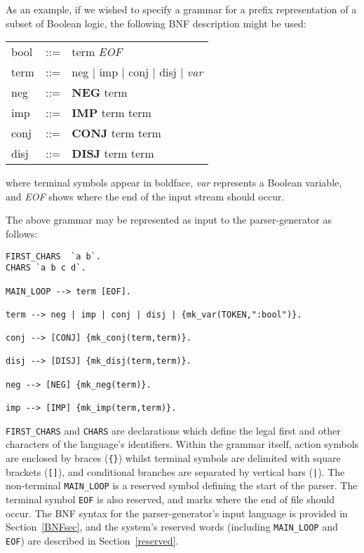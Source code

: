 \newpage
As an example, if we wished to specify a grammar for a prefix representation
of a subset of Boolean logic, the following {\small BNF}
description might be used:
\small
\begin{center}
\begin{boxed}
\begin{tabular}{lcl}
bool & ::= & term {\it EOF} \\
term & ::= & neg $|$ imp $|$ conj $|$ disj
               $|$ {\it var} \\
neg & ::= & {\bf NEG} term \\
imp & ::= & {\bf IMP} term term \\
conj & ::= & {\bf CONJ} term term \\
disj & ::= & {\bf DISJ} term term \\
\end{tabular}
\end{boxed}
\end{center}
\normalsize
where terminal symbols appear in boldface, {\it var} represents a Boolean
variable, and {\it EOF} shows where the end of the input stream should occur.

The above grammar may be represented as input to the 
parser-generator as follows:
\small
\begin{center}
\begin{boxed}
\begin{verbatim}
FIRST_CHARS  `a b`. 
CHARS `a b c d`. 

MAIN_LOOP --> term [EOF]. 

term --> neg | imp | conj | disj | {mk_var(TOKEN,":bool")}. 

conj --> [CONJ] {mk_conj(term,term)}.

disj --> [DISJ] {mk_disj(term,term)}.

neg --> [NEG] {mk_neg(term)}.

imp --> [IMP] {mk_imp(term,term)}.
\end{verbatim}
\end{boxed}
\end{center}
\normalsize
\verb"FIRST_CHARS" and 
\verb"CHARS" are declarations which define the 
legal 
first and other characters of the language's identifiers.  Within the grammar
itself, action symbols are enclosed by braces (\verb"{}") whilst
terminal symbols are delimited with square brackets (\verb"[]"), and 
conditional 
branches are separated by
vertical bars (\verb"|").  The non-terminal 
\verb"MAIN_LOOP" is a reserved
symbol defining the start of the parser.  The terminal symbol 
\verb"EOF" is
also reserved, and marks where the end of file should occur.  The
{\small BNF} syntax for the parser-generator's input language is provided in
Section~\ref{BNFsec}, and the system's reserved words (including 
\verb"MAIN_LOOP" and \verb"EOF") are described in Section~\ref{reserved}.

